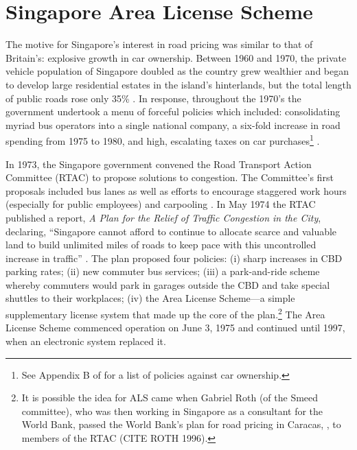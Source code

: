 \section{Singapore Area License Scheme}


The motive for Singapore's interest in road pricing was similar to that of Britain's: explosive growth in car ownership. Between 1960 and 1970, the private vehicle population of Singapore doubled as the country grew wealthier and began to develop large residential estates in the island's hinterlands, but the total length of public roads rose only 35\% \citep[p.211-212]{Santos2004}. In response, throughout the 1970's the government undertook a menu of forceful policies which included: consolidating myriad bus operators into a single national company, a six-fold increase in road spending from 1975 to 1980, and high, escalating taxes on car purchases\footnote{See Appendix B of \citet{Gomez-Ibanez1994} for a list of  policies against car ownership.} \citep{Santos2004}. 

In 1973, the Singapore government convened the Road Transport Action Committee (RTAC) to propose solutions to congestion. The Committee's first proposals included bus lanes as well as efforts to encourage staggered work hours (especially for public employees) and carpooling \citep{Chin1998}. In May 1974 the RTAC published a report, \emph{A Plan for the Relief of Traffic Congestion in the City}, declaring, ``Singapore cannot afford to continue to allocate scarce and valuable land to build unlimited miles of roads to keep pace with this uncontrolled increase in traffic'' \citep[p.3]{SRTAC1974}. The plan proposed four policies: (i) sharp increases in CBD parking rates; (ii) new commuter bus services; (iii) a park-and-ride scheme whereby commuters would park in garages outside the CBD and take special shuttles to their workplaces; (iv) the Area License Scheme---a simple supplementary license system that made up the core of the plan.\footnote{It is possible the idea for ALS came when Gabriel Roth (of the Smeed committee), who was then working in Singapore as a consultant for the World Bank, passed the World Bank's plan for road pricing in Caracas, \citet{Vorhees1973}, to members of the RTAC (CITE ROTH 1996).} The Area License Scheme commenced operation on June 3, 1975 and continued until 1997, when an electronic system replaced it.

